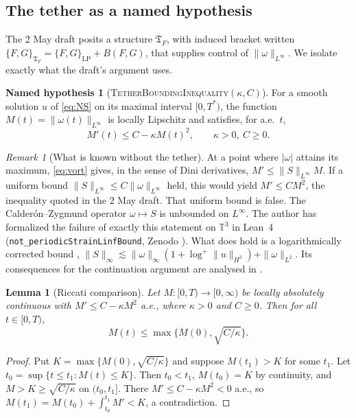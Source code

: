 \documentclass[11pt]{amsart}
\newtheorem{lemma}[theorem]{Lemma}
\theoremstyle{definition}
\newtheorem{hypothesis}[theorem]{Named hypothesis}
\theoremstyle{remark}
\newtheorem{remark}[theorem]{Remark}
\newcommand{\TF}{\mathfrak{T}_F}
\newcommand{\T}{\mathbb{T}}
\begin{document}
\subsection{The tether as a named hypothesis}
The 2 May draft posits a structure $\TF$, with induced bracket written $\{F,G\}_{\TF}=\{F,G\}_{\mathrm{LP}}+B(F,G)$, that supplies control of $\|\omega\|_{L^\infty}$. We isolate exactly what the draft's argument uses.

\begin{hypothesis}[\textsc{TetherBoundingInequality}$(\kappa,C)$]\label{hyp:TBI}
For a smooth solution $u$ of \eqref{eq:NS} on its maximal interval $[0,T^*)$, the function $M(t)=\|\omega(t)\|_{L^\infty}$ is locally Lipschitz and satisfies, for a.e.\ $t$,
\begin{equation}\label{eq:TBI}
M'(t)\le C-\kappa M(t)^2,\qquad \kappa>0,\ C\ge0 .
\end{equation}
\end{hypothesis}

\begin{remark}[What is known without the tether]
At a point where $|\omega|$ attains its maximum, \eqref{eq:vort} gives, in the sense of Dini derivatives, $M'\le\|S\|_{L^\infty}M$. If a uniform bound $\|S\|_{L^\infty}\le C\|\omega\|_{L^\infty}$ held, this would yield $M'\le CM^2$, the inequality quoted in the 2 May draft. That uniform bound is false. The Calder\'on--Zygmund operator $\omega\mapsto S$ is unbounded on $L^\infty$. The author has formalized the failure of exactly this statement on $\T^3$ in Lean~4 (\texttt{not\_periodicStrainLinfBound}, Zenodo \cite{FrohmanStrain}). What does hold is a logarithmically corrected bound \cite{BKM1984}, $\|S\|_\infty\lesssim \|\omega\|_\infty(1+\log^+\|u\|_{H^3})+\|\omega\|_{L^2}$. Its consequences for the continuation argument are analysed in \cite{FrohmanViscous,FrohmanCubic}.
\end{remark}

\begin{lemma}[Riccati comparison]\label{lem:riccati}
Let $M:[0,T)\to[0,\infty)$ be locally absolutely continuous with $M'\le C-\kappa M^2$ a.e., where $\kappa>0$ and $C\ge0$. Then for all $t\in[0,T)$,
\[
M(t)\le \max\{M(0),\sqrt{C/\kappa}\}.
\]
\end{lemma}
\begin{proof}
Put $K=\max\{M(0),\sqrt{C/\kappa}\}$ and suppose $M(t_1)>K$ for some $t_1$. Let $t_0=\sup\{t\le t_1: M(t)\le K\}$. Then $t_0<t_1$, $M(t_0)=K$ by continuity, and $M>K\ge\sqrt{C/\kappa}$ on $(t_0,t_1]$. There $M'\le C-\kappa M^2<0$ a.e., so $M(t_1)=M(t_0)+\int_{t_0}^{t_1}M'<K$, a contradiction.
\end{proof}
\end{document}
